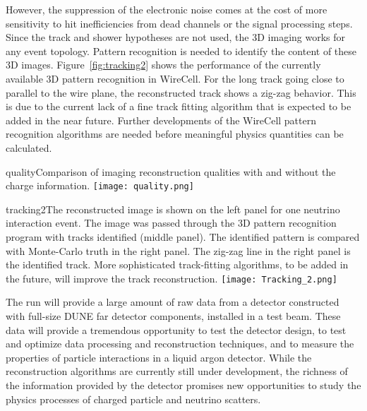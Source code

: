 %
However, the suppression of the electronic noise comes at the cost of more
sensitivity to hit inefficiencies from dead channels or the signal processing steps.
 Since the track and shower hypotheses
are not used, the 3D imaging works for any event topology. 
Pattern recognition is needed to identify 
the content of these 3D images. Figure~\ref{fig:tracking2} shows the 
performance of the currently available 3D pattern recognition in
WireCell. For the long track going close to parallel to the wire plane, the reconstructed
track shows a zig-zag behavior. This is due to the current lack of a fine track fitting algorithm
that is expected to be added in the near future. 
Further developments of the WireCell pattern recognition algorithms
are needed before meaningful physics quantities can be calculated.
%
\begin{cdrfigure}{quality}{Comparison of imaging reconstruction 
qualities with and without the charge information. }
\texttt{[image: quality.png]}
\end{cdrfigure}
%
%
\begin{cdrfigure}{tracking2}{The reconstructed image is shown 
on the left panel for one neutrino interaction event. The image 
was passed through the 3D pattern recognition program with tracks 
identified (middle panel). The identified pattern is compared 
with Monte-Carlo truth in the right panel. The zig-zag line in the right 
panel is the identified track.  More sophisticated track-fitting algorithms, to be added in the future,
will improve the track reconstruction.}
 \texttt{[image: Tracking\_2.png]}
\end{cdrfigure}

The \pdsp run will provide a large amount of raw data from a detector constructed with full-size DUNE
far detector components, installed in a test beam.  These data will provide a tremendous opportunity
to test the detector design, to test and optimize data processing and reconstruction techniques, and
to measure the properties of particle interactions in a liquid argon detector.  While the reconstruction
algorithms are currently still under development, the richness of the information provided by the detector
promises new opportunities to study the physics processes of charged particle and neutrino scatters.
